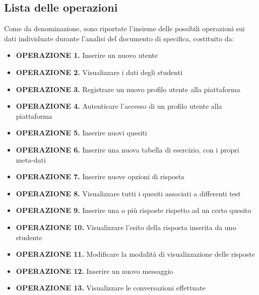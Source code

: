 \documentclass{article}
\begin{document}
\subsection{Lista delle operazioni}
\large
Come da denominazione, sono riportate l'insieme delle possibili operazioni sui dati individuate durante l'analisi del documento di specifica, costituito da: 
\begin{itemize}[label={-}]
    \itemsep1px
    \item {\small\bf{OPERAZIONE 1.}} \hspace*{1px} Inserire un nuovo utente
    \item {\small\bf{OPERAZIONE 2.}} \hspace*{1px} Visualizzare i dati degli studenti 
    \item {\small\bf{OPERAZIONE 3.}} \hspace*{1px} Registrare un nuovo profilo utente alla piattaforma 
    \item {\small\bf{OPERAZIONE 4.}} \hspace*{1px} Autenticare l'accesso di un profilo utente alla piattaforma
    \item {\small\bf{OPERAZIONE 5.}} \hspace*{1px} Inserire nuovi quesiti 
    \item {\small\bf{OPERAZIONE 6.}} \hspace*{1px} Inserire una nuova tabella di esercizio, con i propri meta-dati 
    \item {\small\bf{OPERAZIONE 7.}} \hspace*{1px} Inserire nuove opzioni di risposta
    \item {\small\bf{OPERAZIONE 8.}} \hspace*{1px} Visualizzare tutti i quesiti associati a differenti test 
    \item {\small\bf{OPERAZIONE 9.}} \hspace*{1px} Inserire una o più risposte rispetto ad un certo quesito 
    \item {\small\bf{OPERAZIONE 10.}} Visualizzare l'esito della risposta inserita da uno studente
    \item {\small\bf{OPERAZIONE 11.}} Modificare la modalità di visualizzazione delle risposte
    \item {\small\bf{OPERAZIONE 12.}} Inserire un nuovo messaggio 
    \item {\small\bf{OPERAZIONE 13.}} Visualizzare le conversazioni effettuate
\end{itemize}
\end{document}
